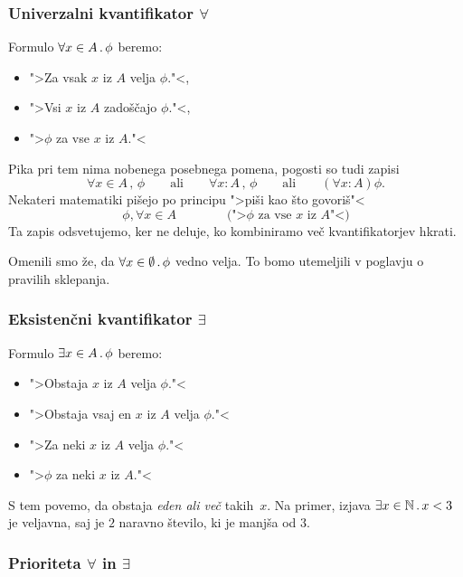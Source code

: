 \subsubsection{Univerzalni kvantifikator $\forall$}

Formulo $\forall x \in A \,.\, \phi$ beremo:
%
\begin{itemize}
\item ">Za vsak $x$ iz $A$ velja $\phi$."<,
\item ">Vsi $x$ iz $A$ zadoščajo $\phi$."<,
\item ">$\phi$ za vse $x$ iz $A$."<
\end{itemize}
%
Pika pri tem nima nobenega posebnega pomena, pogosti so tudi zapisi
%
\begin{equation*}
  \forall x \in A \,,\, \phi
  \qquad\text{ali}\qquad
  \forall x : A \,,\, \phi
  \qquad\text{ali}\qquad
  (\forall x : A) \phi.
\end{equation*}
%
Nekateri matematiki pišejo po principu ">piši kao što govoriš"<
%
\begin{equation*}
  \phi, \forall x \in A
  \qquad\qquad \text{(">$\phi$ za vse $x$ iz $A$"<)}
\end{equation*}
%
Ta zapis odsvetujemo, ker ne deluje, ko kombiniramo več kvantifikatorjev hkrati.

Omenili smo že, da $\forall x \in \emptyset \,.\, \phi$ vedno velja. To bomo utemeljili v poglavju o pravilih sklepanja.

\subsubsection{Eksistenčni kvantifikator $\exists$}

Formulo $\exists x \in A \,.\, \phi$ beremo:
%
\begin{itemize}
\item ">Obstaja $x$ iz $A$ velja $\phi$."<
\item ">Obstaja vsaj en $x$ iz $A$ velja $\phi$."<
\item ">Za neki $x$ iz $A$ velja $\phi$."<
\item ">$\phi$ za neki $x$ iz $A$."<
\end{itemize}
%
S tem povemo, da obstaja \emph{eden ali več} takih~$x$. Na primer, izjava $\exists x \in \mathbb{N} \,.\, x
< 3$ je veljavna, saj je $2$ naravno število, ki je manjša od $3$.


\subsubsection{Prioriteta $\forall$ in $\exists$}

